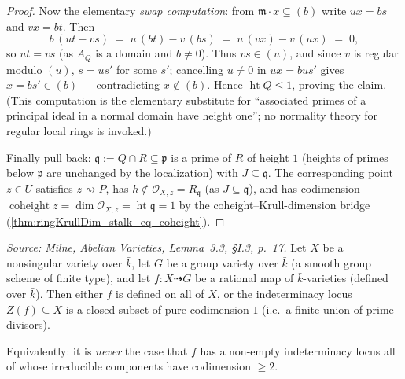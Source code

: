 \begin{proof}
  Now the elementary \emph{swap computation}: from \(\mathfrak m \cdot x \subseteq (b)\)
  write \(u x = b s\) and \(v x = b t\). Then
  \[
    b \,(u t - v s) \;=\; u\,(b t) - v\,(b s) \;=\; u\,(v x) - v\,(u x) \;=\; 0,
  \]
  so \(u t = v s\) (as \(A_Q\) is a domain and \(b \neq 0\)). Thus \(v s \in (u)\), and
  since \(v\) is regular modulo \((u)\), \(s = u s'\) for some \(s'\); cancelling
  \(u \neq 0\) in \(u x = b u s'\) gives \(x = b s' \in (b)\) --- contradicting
  \(x \notin (b)\). Hence \(\operatorname{ht} Q \leq 1\), proving the claim. (This
  computation is the elementary substitute for ``associated primes of a principal ideal
  in a normal domain have height one''; no normality theory for regular local rings is
  invoked.)

  Finally pull back: \(\mathfrak q := Q \cap R \subseteq \mathfrak p\) is a prime of
  \(R\) of height \(1\) (heights of primes below \(\mathfrak p\) are unchanged by the
  localization) with \(J \subseteq \mathfrak q\). The corresponding point \(z \in U\)
  satisfies \(z \rightsquigarrow P\), has \(h \notin \mathcal O_{X, z} = R_{\mathfrak q}\)
  (as \(J \subseteq \mathfrak q\)), and has codimension
  \(\operatorname{coheight} z = \dim \mathcal O_{X, z} = \operatorname{ht} \mathfrak q
  = 1\) by the coheight--Krull-dimension bridge
  (\cref{thm:ringKrullDim_stalk_eq_coheight}).
\end{proof}

\begin{lemma}


  \label{lem:milne_codim1_indeterminacy}
  \textit{Source: Milne, \emph{Abelian Varieties}, Lemma~3.3, \S I.3, p.~17.}
  Let \(X\) be a nonsingular variety over \(\bar k\), let \(G\) be a group variety over
  \(\bar k\) (a smooth group scheme of finite type), and let \(f \colon X \dashrightarrow
  G\) be a rational map of \(\bar k\)-varieties (defined over \(\bar k\)).
  Then either \(f\) is defined on all of \(X\), or the indeterminacy
  locus \(Z(f) \subseteq X\) is a closed subset of pure codimension \(1\) (i.e.\ a finite
  union of prime divisors).

  Equivalently: it is \emph{never} the case that \(f\) has a non-empty indeterminacy
  locus all of whose irreducible components have codimension \(\geq 2\).
\end{lemma}

